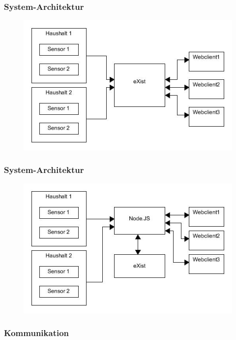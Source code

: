 \documentclass{beamer}
\begin{document}
\begin{frame}
\frametitle{System-Architektur}
\begin{figure}[H]
\begin{center}
\includegraphics[scale=0.5]{images/sa1.jpg} 
\end{center}
\end{figure}
\end{frame}

\begin{frame}
\frametitle{System-Architektur}
\begin{figure}[H]
\begin{center}
\includegraphics[scale=0.5]{images/sa2.jpg} 
\end{center}
\end{figure}
\end{frame}

\begin{frame}
\frametitle{Kommunikation}
\end{frame}
\end{document}
